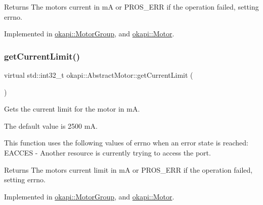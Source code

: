 \begin{DoxyReturn}{Returns}
The motor\textquotesingle{}s current in mA or P\+R\+O\+S\+\_\+\+E\+RR if the operation failed, setting errno. 
\end{DoxyReturn}


Implemented in \mbox{\hyperlink{classokapi_1_1MotorGroup_a5cdc06b92c943b2348130b162f6c5f16}{okapi\+::\+Motor\+Group}}, and \mbox{\hyperlink{classokapi_1_1Motor_ac5107f8aef228d4b4fec06d549c55cf6}{okapi\+::\+Motor}}.

\mbox{\label{classokapi_1_1AbstractMotor_ab83ef3319ffe1cb1d020e5a10127aab8}} 
\subsubsection{\texorpdfstring{getCurrentLimit()}{getCurrentLimit()}}
{\footnotesize\ttfamily virtual std\+::int32\+\_\+t okapi\+::\+Abstract\+Motor\+::get\+Current\+Limit (\begin{DoxyParamCaption}{ }\end{DoxyParamCaption})\hspace{0.3cm}{\ttfamily [pure virtual]}}

Gets the current limit for the motor in mA.

The default value is 2500 mA.

This function uses the following values of errno when an error state is reached\+: E\+A\+C\+C\+ES -\/ Another resource is currently trying to access the port.

\begin{DoxyReturn}{Returns}
The motor\textquotesingle{}s current limit in mA or P\+R\+O\+S\+\_\+\+E\+RR if the operation failed, setting errno. 
\end{DoxyReturn}


Implemented in \mbox{\hyperlink{classokapi_1_1MotorGroup_afe3f1ed73d64cc7204074d5cdb2a874e}{okapi\+::\+Motor\+Group}}, and \mbox{\hyperlink{classokapi_1_1Motor_ae309fb32ea479cec950dfaa65f3ffebd}{okapi\+::\+Motor}}.

\mbox{\label{classokapi_1_1AbstractMotor_a94763d1700bd91b995333b012c0b683f}} 
